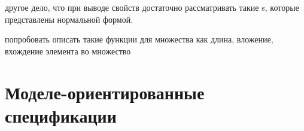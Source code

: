 \documentclass[14pt]{extreport}
\makeatletter
\renewcommand\appendix{\par
  \setcounter{chapter}{0}%
  \setcounter{section}{0}%
  \def\@chapapp{\appendixname}%
  \def\thechapter{\@Asbuk\c@chapter}}
\makeatother
\begin{document}
другое дело, что при выводе свойств достаточно рассматривать такие s, которые представлены нормальной формой.


попробовать описать такие функции для множества как длина, вложение, вхождение элемента во множество


 
\chapter{Моделе-ориентированные спецификации}


\appendix


\pagebreak
{}


\end{document}
